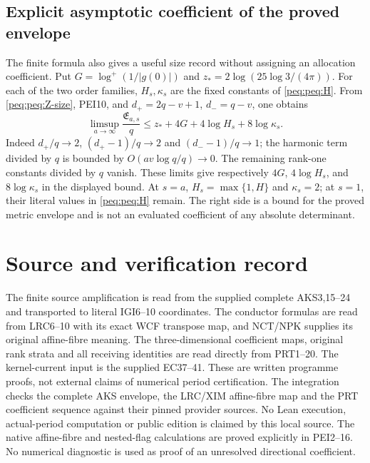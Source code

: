 \documentclass[11pt,a4paper]{article}
\begin{document}
\subsection{Explicit asymptotic coefficient of the proved envelope}

The finite formula also gives a useful size record without assigning
an allocation coefficient. Put
$G=\log^+(1/|g(0)|)$ and
$z_* =2\log(25\log3/(4\pi))$.
For each of the two order families, $H_s,\kappa_s$ are the fixed
constants of \eqref{peq:peq:H}. From \eqref{peq:peq:Z-size},
PEI10, and $d_+=2q-v+1$, $d_-=q-v$, one obtains
\[
 \limsup_{a\to\infty}\frac{\mathfrak E_{a,s}}q
 \le z_*+4G+4\log H_s+8\log\kappa_s.                            \tag{PEI17}
\]
Indeed $d_+/q\to2$, $(d_+-1)/q\to2$ and
$(d_--1)/q\to1$; the harmonic term divided by $q$ is bounded
by $O(av\log q/q)\to0$. The remaining rank-one constants divided
by $q$ vanish. These limits give respectively $4G$,
$4\log H_s$, and $8\log\kappa_s$ in the displayed bound.
At $s=a$, $H_s=\max\{1,H\}$ and $\kappa_s=2$;
at $s=1$, their literal values in \eqref{peq:peq:H} remain.
The right side is a bound for the proved metric envelope and is
not an evaluated coefficient of any absolute determinant.


\section*{Source and verification record}
The finite source amplification is read from the supplied complete AKS3,15--24 and transported to literal IGI6--10 coordinates. The conductor formulas are read from LRC6--10 with its exact WCF transpose map, and NCT/NPK supplies its original affine-fibre meaning. The three-dimensional coefficient maps, original rank strata and all receiving identities are read directly from PRT1--20. The kernel-current input is the supplied EC37--41. These are written programme proofs, not external claims of numerical period certification. The integration checks the complete AKS envelope, the LRC/XIM affine-fibre map and the PRT coefficient sequence against their pinned provider sources. No Lean execution, actual-period computation or public edition is claimed by this local source. The native affine-fibre and nested-flag calculations are proved explicitly in PEI2--16. No numerical diagnostic is used as proof of an unresolved directional coefficient.



\endgroup
\end{document}
